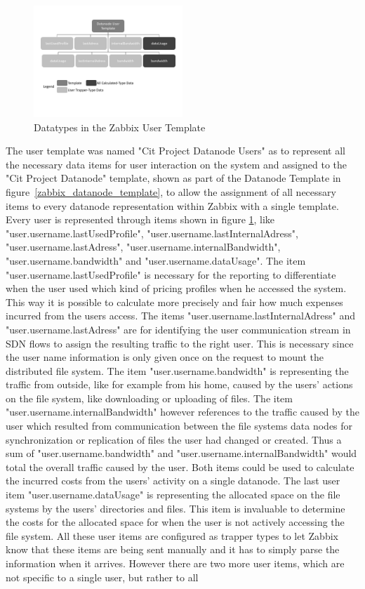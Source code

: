 \begin{figure}[ht]
\centering
\includegraphics[width=0.5\textwidth]{img/ZabbixUserTemp} 

\caption{Datatypes in the Zabbix User Template}
\label{zabbix_user_template}
\end{figure}	
	The user template was named "Cit Project Datanode Users" as to represent all the necessary data items for user interaction on the system and assigned to the "Cit Project Datanode" template, shown as part of the Datanode Template in figure~\ref{zabbix_datanode_template}, to allow the assignment of all necessary items to every datanode representation within Zabbix with a single template. Every user is represented through items shown in figure \ref{zabbix_user_template}, like "user.username.lastUsedProfile", "user.username.lastInternalAdress", "user.username.lastAdress", "user.username.internalBandwidth", "user.username.bandwidth" and "user.username.dataUsage". The item "user.username.lastUsedProfile" is necessary for the reporting to differentiate when the user used which kind of pricing profiles when he accessed the system. This way it is possible to calculate more precisely and fair how much expenses incurred from the users access. The items "user.username.lastInternalAdress" and "user.username.lastAdress" are for identifying the user communication stream in SDN flows to assign the resulting traffic to the right user. This is necessary since the user name information is only given once on the request to mount the distributed file system. The item "user.username.bandwidth" is representing the traffic from outside, like for example from his home, caused by the users' actions on the file system, like downloading or uploading of files. The item "user.username.internalBandwidth" however references to the traffic caused by the user which resulted from communication between the file systems data nodes for synchronization or replication of files the user had changed or created. Thus a sum of "user.username.bandwidth" and "user.username.internalBandwidth" would total the overall traffic caused by the user. Both items could be used to calculate the incurred costs from the users' activity on a single datanode. The last user item "user.username.dataUsage" is representing the allocated space on the file systems by the users' directories and files. This item is invaluable to determine the costs for the allocated space for when the user is not actively accessing the file system. All these user items are configured as trapper types to let Zabbix know that these items are being sent manually and it has to simply parse the information when it arrives. However there are two more user items, which are not specific to a single user, but rather to all 